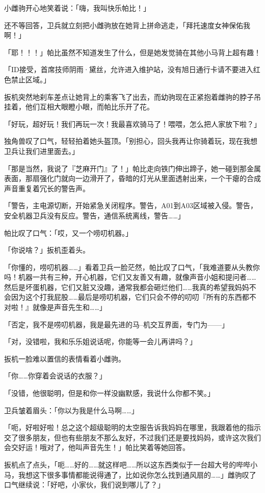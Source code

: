 小雌驹开心地笑着说：「嗨，我叫快乐帕比！」

还不等回答，卫兵就立刻把小雌驹放在她背上拼命逃走，「拜托速度女神保佑我啊！」

「耶！！！」帕比虽然不知道发生了什么，但是她发觉骑在其他小马背上超有趣！

「{\mt ID接受，首席技师阴雨·黛丝，允许进入维护站，没有旭日通行卡请不要进入红色禁止区域。}」

扳机突然地刹车差点让她背上的乘客飞了出去，而幼驹现在正紧抱着雌驹的脖子吊挂着，他们互相大眼瞪小眼，而帕比乐开了花。

「好玩，超好玩！我们再玩一次！我最喜欢骑马了！喂喂，怎么把人家放下啦？」

独角兽叹了口气，轻轻拍着她头盔顶。「别担心，回头我再让你骑着玩，现在我想卫兵让我们进里面去。」

「那是当然，我说了『芝麻开门』了！」帕比走向铁门伸出蹄子，她一碰到那金属表面，那扇强化门就向一边滑开了，昏暗的灯光从里面透射出来，一个干瘪的合成声音重复着冗长的警告声。

「{\mt 警告，主电源切断，开始紧急关闭程序。警告，A01到A03区域被入侵。警告，安全机器卫兵没有反应。警告，通信系统离线，警告……}」

帕比叹了口气：「哎，又一个唠叨机器。」

「你说啥？」扳机歪着头。

「你懂的，唠叨机器……」看着卫兵一脸茫然，帕比叹了口气，「我难道要从头教你吗！机器一共有三种，开心机器，它们又友善又有趣，就像声音小姐和提问者……然后是坏蛋机器，它们又脏又没趣，通常我都会砸烂他们……我真的希望我妈妈不会因为这个打我屁股……最后是唠叨机器，它们只会不停的叨叨『所有的东西都不对啦！』就像是声音先生和……」

「{\mt 否定，我不是唠叨机器，我是最先进的马--机交互界面，专门为——}」

「对，没错啦，我和乐乐姐说话呢，你能等一会儿再讲吗？」

扳机一脸难以置信的表情看着小雌驹。

「你……你穿着会说话的衣服？」

「没错，他很聪明，但是和你一样没幽默感，我说什么你都不笑。」

卫兵皱着眉头：「你以为我是什么马啊……」

「呃，好啦好啦！总之这个超级聪明的太空服告诉我妈妈在哪里，我跟着他的指示交了很多朋友，但也有些朋友不那么友好，不过我们还是要找妈妈，或许这次我们会交好运！哦对了，他叫声音先生！」帕比笑着等她回答。

扳机点了点头，「呃……好的……就这样吧……所以这东西类似于一台超大号的哔哔小马，我想这下很多事情都能说得通了，比如说你怎么找到通风扇的……」雌驹叹了口气继续说：「好吧，小家伙，我们说到哪儿了？」

